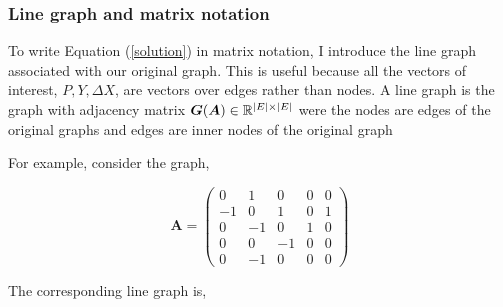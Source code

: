 \documentclass[american]{scrartcl}
\newcommand{\R}{\mathbb{R}}
\newcommand{\matr}[1]{\bm{#1}}
\DeclarePairedDelimiter\abs{\lvert}{\rvert}%
\begin{document}
\subsubsection{Line graph and matrix notation}


To write Equation (\ref{solution}) in matrix notation, I introduce the line graph associated with our original graph. This is useful because all the vectors of interest, $P, Y, \Delta X$, are vectors over edges rather than nodes. A line graph is the graph with adjacency matrix $\matr{G}(\matr{A}) \in \R^{\abs{E} \times \abs{E}}$ were the nodes are edges of the original graphs and edges are inner nodes of the original graph

For example, consider the graph,

\vspace{0.5em}
\begin{minipage}{0.6\textwidth}
\end{minipage} \hfill
\begin{minipage}{0.35\textwidth}
	\begin{equation*}
		\matr{A} = \begin{pmatrix}
			0  & 1  & 0  & 0 & 0 \\
			-1 & 0  & 1  & 0 & 1 \\
			0  & -1 & 0  & 1 & 0 \\
			0  & 0  & -1 & 0 & 0 \\
			0  & -1 & 0  & 0 & 0
		\end{pmatrix}
	\end{equation*}
\end{minipage}


The corresponding line graph is,
\end{document}
